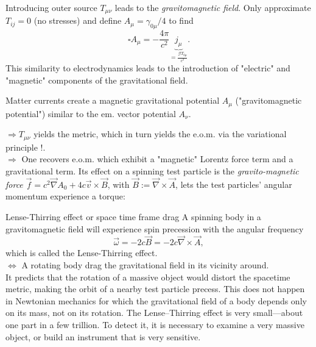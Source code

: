Introducing outer source $T_{\mu \nu}$ leads to the \emph{gravitomagnetic field}. Only approximate $T_{ij}=0$ (no stresses) and define $A_{\mu} = \gamma_{0 \mu} /4$ to find
\begin{equation}
	\square A_{\mu} = - \frac{4 \pi}{c^2} \underbrace{j_{\mu}}_{=\frac{\mathcal{G}T_{0 \mu}}{c^2}}.
\end{equation}
This similarity to electrodynamics leads to the introduction of "electric" and "magnetic" components of the gravitational field.
\begin{statements}
	Matter currents create a magnetic gravitational potential $A_{\mu}$ ("gravitomagnetic potential") similar to the em. vector potential $A_{\nu}$.
\end{statements}
$\Rightarrow T_{\mu \nu}$ yields the metric, which in turn yields the e.o.m. via the variational principle !.\\
$\Rightarrow$ One recovers e.o.m. which exhibit a "magnetic" Lorentz force term and a gravitational term. Its effect on a spinning test particle is the \emph{gravito-magnetic force} $\vec{f} = c^2\vec{\nabla} A_0 + 4 c \vec{v} \times \vec{B}$, with $\vec{B}:= \vec{\nabla} \times \vec{A}$, lets the test particles' angular momentum experience a torque:
\begin{mybox}{Lense-Thirring effect or space time frame drag}
	A spinning body in a gravitomagnetic field will experience spin precession with the angular frequency \begin{equation}
		\vec{\omega} = -2 c \vec{B} = - 2 c\vec{\nabla }\times \vec{A},
	\end{equation}
	which is called the Lense-Thirring effect.\\
	$\Leftrightarrow$ A rotating body drag the gravitational field in its vicinity around.\\
	It predicts that the rotation of a massive object would distort the spacetime metric, making the orbit of a nearby test particle precess. This does not happen in Newtonian mechanics for which the gravitational field of a body depends only on its mass, not on its rotation. The Lense–Thirring effect is very small—about one part in a few trillion. To detect it, it is necessary to examine a very massive object, or build an instrument that is very sensitive.
\end{mybox}

